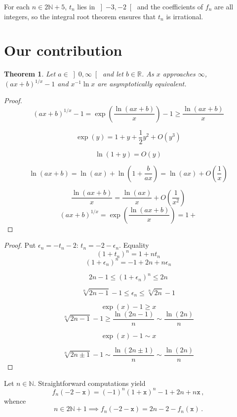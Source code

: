\documentclass[12pt]{article}
\newcommand{\bR}{\mathbb{R}}
\newcommand{\bN}{\mathbb{N}}
\newcommand{\gtint}[1]{\left] #1, \infty \right[}
\newcommand{\ttx}{\mathtt{x}}
\newtheorem{theorem}{Theorem}
\begin{document}
For each $n \in 2 \bN + 5$, $t_n$ lies in $\left]- 3, - 2 \right[$ and the coefficients of $f_n$ are all integers,
so the integral root theorem ensures that $t_n$ is irrational.

\section{Our contribution}

\begin{theorem}
  Let $a \in \gtint{0}$ and let $b \in \bR$.
 As $x$ approaches $\infty$, 
 ${(a x + b)}^{1 / x} - 1$
 and
 $x^{-1} \ln x$ are asymptotically equivalent.
\end{theorem}

\begin{proof}
  
  $$
  {(a x + b)}^{1 / x} - 1 = \exp \left( \frac{\ln (a x + b)}{x} \right) - 1 \ge   \frac{\ln (a x + b)}{x} 
  $$
  
  $$
  \exp(y) = 1 + y + \frac{1}{2} y^2 + O(y^3)  
  $$

  $$
  \ln(1 + y) = O(y) 
  $$

  $$
  \ln(a x + b) = \ln (a x) + \ln \left(1 +  \frac{b}{a x} \right) = \ln(a x) + O \left( \frac{1} {x} \right)
  $$

  $$
   \frac{\ln(ax + b)}{x} = \frac{\ln(a x)}{x} + O \left( \frac{1}{x^2} \right)
  $$
  $$
  {(a x + b)}^{1 / x} = \exp \left( \frac{\ln( a x + b)}{x}  \right) = 1 + 
  $$
\end{proof} 

\begin{proof}
  Put $\epsilon_n = - t_n - 2$: $t_n = - 2 - \epsilon_n$.
  Equality
  $$
  {(1 + t_n)}^n = 1 + n t_n 
  $$
  $$
   {(1 + \epsilon_n)}^n  = - 1 + 2 n + n \epsilon_n 
   $$

   $$
   2 n - 1 \le {(1 + \epsilon_n)}^n  \le  2 n 
   $$

   $$
   \sqrt[n]{2 n - 1} - 1 \le \epsilon_n  \le \sqrt[n]{2 n} - 1
   $$

   $$
   \exp(x) - 1 \ge x
   $$
   $$
   \sqrt[n]{2n - 1} - 1 \ge \frac{\ln(2n - 1)}{n} \sim \frac{\ln(2n)}{n} 
   $$

   $$
   \exp(x) - 1 \sim  x
   $$
   
   $$
   \sqrt[n]{2n \pm 1} - 1 \sim \frac{\ln(2n \pm 1)}{n} \sim \frac{\ln(2n)}{n} 
   $$
   
\end{proof}
Let $n \in \bN$.
Straightforward computations yield
$$
f_n(- 2 - \ttx) = {(- 1)}^n {(1 + \ttx)}^n - 1 + 2n + n \ttx \, , 
$$
whence 
\begin{equation} \label{eq:fn-2-x-odd}
  n \in 2 \bN + 1
  \implies 
 f_n(- 2 - \ttx) = 2n - 2 - f_n(\ttx)   \, .
\end{equation} 
 
\end{document}
